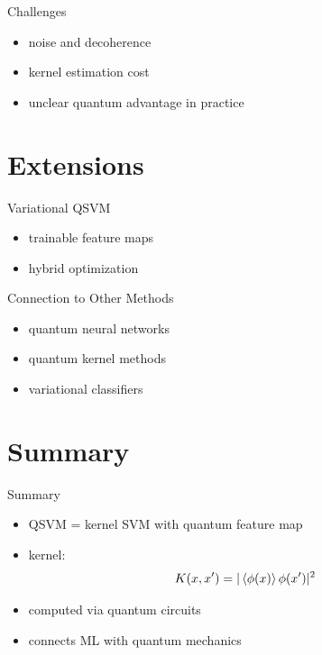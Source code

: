 \documentclass{beamer}
\begin{document}

\begin{frame}{Challenges}
\begin{itemize}
\item noise and decoherence
\item kernel estimation cost
\item unclear quantum advantage in practice
\end{itemize}
\end{frame}


\section{Extensions}

\begin{frame}{Variational QSVM}
\begin{itemize}
\item trainable feature maps
\item hybrid optimization
\end{itemize}
\end{frame}


\begin{frame}{Connection to Other Methods}
\begin{itemize}
\item quantum neural networks
\item quantum kernel methods
\item variational classifiers
\end{itemize}
\end{frame}


\section{Summary}

\begin{frame}{Summary}
\begin{itemize}
\item QSVM = kernel SVM with quantum feature map
\item kernel:
\[
K(x,x') = |\braket{\phi(x)}{\phi(x')}|^2
\]
\item computed via quantum circuits
\item connects ML with quantum mechanics
\end{itemize}
\end{frame}
\end{document}
